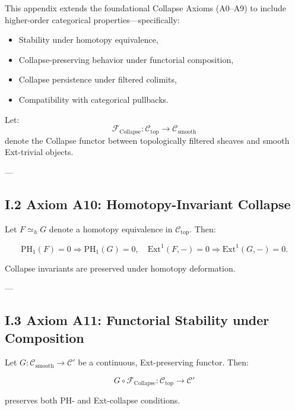 \documentclass[11pt]{article}
\begin{document}
This appendix extends the foundational Collapse Axioms (A0–A9) to include higher-order categorical properties—specifically:

\begin{itemize}
  \item Stability under homotopy equivalence,
  \item Collapse-preserving behavior under functorial composition,
  \item Collapse persistence under filtered colimits,
  \item Compatibility with categorical pullbacks.
\end{itemize}

Let:
\[
\mathcal{F}_{\mathrm{Collapse}} : \mathcal{C}_{\mathrm{top}} \to \mathcal{C}_{\mathrm{smooth}}
\]
denote the Collapse functor between topologically filtered sheaves and smooth Ext-trivial objects.

---

\subsection*{I.2 Axiom A10: Homotopy-Invariant Collapse}

\begin{axiom}
Let $F \simeq_h G$ denote a homotopy equivalence in $\mathcal{C}_{\mathrm{top}}$. Then:

\[
\mathrm{PH}_1(F) = 0 \Rightarrow \mathrm{PH}_1(G) = 0,
\quad \mathrm{Ext}^1(F, -) = 0 \Rightarrow \mathrm{Ext}^1(G, -) = 0.
\]

Collapse invariants are preserved under homotopy deformation.
\end{axiom}

---

\subsection*{I.3 Axiom A11: Functorial Stability under Composition}

\begin{axiom}
Let $G : \mathcal{C}_{\mathrm{smooth}} \to \mathcal{C}'$ be a continuous, Ext-preserving functor. Then:

\[
G \circ \mathcal{F}_{\mathrm{Collapse}} : \mathcal{C}_{\mathrm{top}} \to \mathcal{C}'
\]

preserves both PH- and Ext-collapse conditions.
\end{axiom}
\end{document}
